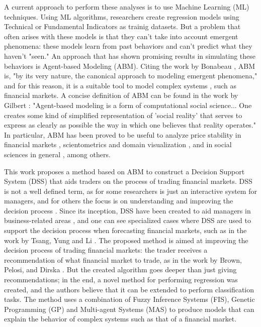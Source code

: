 \documentclass[12pt,journal,draftcls,onecolumn]{IEEEtran}
\begin{document}
A current approach to perform these analyses is to use Machine Learning (ML) techniques. %
Using ML algorithms, researchers create regression models using Technical or Fundamental Indicators as trainig datasets. %
But a problem that often arises with these models is that they can't take into account emergent phenomena: these models learn from past behaviors and can't predict what they haven't "seen." An approach that has shown promising results in simulating these behaviors is Agent-based Modeling (ABM). Citing the work by Bonabeau \cite{bonabeau2002agent}, ABM is, "by its very nature, the canonical approach to modeling emergent phenomena," and for this reason, it is a suitable tool to model complex systems \cite{jennings2001agent}, such as financial markets. A concise definition of ABM can be found in the work by Gilbert \cite{gilbert2008agent}: "Agent-based modeling is a form of computational social science... One creates some kind of simplified representation of 'social reality' that serves to express as clearly as possible the way in which one believes that reality operates." In particular, ABM has been proved to be useful to analyze price stability in financial markets \cite{Pellizzari2007}, scientometrics and domain visualization \cite{Niazi2011}, and in social sciences in general \cite{gilbert2008agent}, among others.

This work proposes a method based on ABM to construct a Decision Support System (DSS) that aids traders on the process of trading financial markets. DSS is not a well defined term, as for some researchers is just an interactive system for managers, and for others the focus is on understanding and improving the decision process \cite{keen1980decision}. Since its inception, DSS have been created to aid managers in business-related areas \cite{Sprague1980} \cite{little1979decision}, and one can see specialized cases where DSS are used to support the decision process when forecasting financial markets, such as in the work by Tsang, Yung and Li \cite{Tsang2004}. The proposed method is aimed at improving the decision process of trading financial markets: the trader receives a recommendation of what financial market to trade, as in the work by Brown, Pelosi, and Dirska \cite{brown2013dynamic}. But the created algorithm goes deeper than just giving recommendations; in the end, a novel method for performing regression was created, and the authors believe that it can be extended to perform classification tasks. The method uses a combination of Fuzzy Inference Systems (FIS), Genetic Programming (GP) \cite{poli2008field} \cite{Koza1992} and Multi-agent Systems (MAS) \cite{Shoham2009} to produce models that can explain the behavior of complex systems such as that of a financial market.
\end{document}
